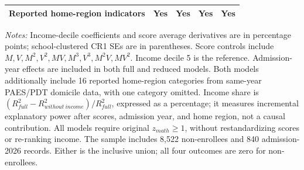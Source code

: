 \begin{table}[!htbp]
\begin{tabular}{lrrrr}
Reported home-region indicators & Yes & Yes & Yes & Yes \\
\hline\hline\end{tabular}
\begin{minipage}{0.98\textwidth}\footnotesize
\textit{Notes:} Income-decile coefficients and score average derivatives are in percentage points; school-clustered CR1 SEs are in parentheses. Score controls include $M,V,M^2,V^2,MV,M^3,V^3,M^2V,MV^2$. Income decile 5 is the reference. Admission-year effects are included in both full and reduced models. Both models additionally include 16 reported home-region categories from same-year PAES/PDT domicile data, with one category omitted. Income share is $(R^2_{full}-R^2_{without\ income})/R^2_{full}$, expressed as a percentage; it measures incremental explanatory power after scores, admission year, and home region, not a causal contribution. All models require original $z_{math} \geq 1$, without restandardizing scores or re-ranking income. The sample includes 8,522 non-enrollees and 840 admission-2026 records. Either is the inclusive union; all four outcomes are zero for non-enrollees.
\end{minipage}
\end{table}
